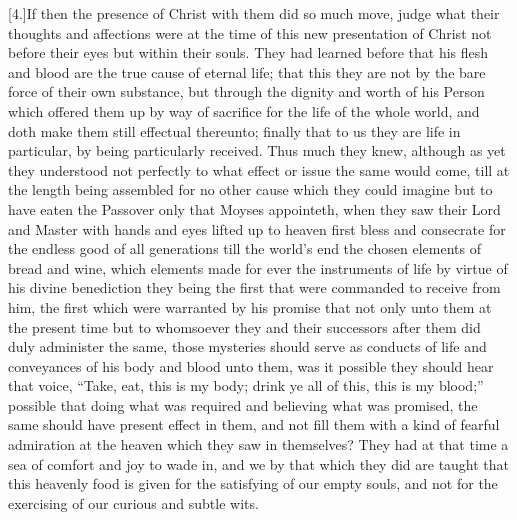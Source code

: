 [4.]If then the presence of Christ with them did so much move, judge what their thoughts and affections were at the time of this new presentation of Christ not before their eyes but within their souls. They had learned before that his flesh and blood are the true cause of eternal life; that this they are not by the bare force of their own substance, but through the dignity and worth of his Person which offered them up by way of sacrifice for the life of the whole world, and doth make them still effectual thereunto; finally that to us they are life in particular, by being particularly received. Thus much they knew, although as yet they understood not perfectly to what effect or issue the same would come, till at the length being assembled for no other cause which they could imagine but to have eaten the Passover only that Moyses appointeth, when they saw their Lord and Master with hands and eyes lifted up to heaven first bless and consecrate for the endless good of all generations till the world’s end the chosen elements of bread and wine, which elements made for ever the instruments of life by virtue of his divine benediction they being the first that were commanded to receive from him, the first which were warranted by his promise that not only unto them at the present time but to whomsoever they and their successors after them did duly administer the same, those mysteries should serve as conducts of life and conveyances of his body and blood unto them, was it possible they should hear that voice, “Take, eat, this is my body; drink ye all of this, this is my blood;” possible that doing what was required and believing what was promised, the same should have present effect in them, and not fill them with a kind of fearful admiration at the heaven which they saw in themselves? They had at that time a sea of comfort and joy to wade in, and we by that which they did are taught that this heavenly food is given for the satisfying of our empty souls, and not for the exercising of our curious and subtle wits.




